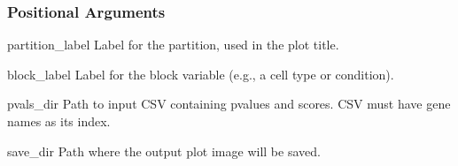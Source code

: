 \documentclass[letterpaper,10pt,english]{sphinxmanual}
\begin{document}
\begin{sphinxVerbatim}[commandchars=\\\{\}]
  \PYG{p}{[}\PYG{p}{]} \PYG{p}{[}  \PYG{p}{[} \PYG{p}{]}\PYG{p}{]} \PYG{p}{[} \PYG{p}{]} \PYG{p}{[} \PYG{p}{]}
                             \PYG{p}{[}  \PYG{p}{[} \PYG{p}{]}\PYG{p}{]}
                                
\end{sphinxVerbatim}


\subsubsection{Positional Arguments}
\label{\detokenize{cli:positional-arguments_repeat3}}\begin{optionlist}{3cm}
\item [partition\_label]  
\sphinxAtStartPar
Label for the partition, used in the plot title.
\item [block\_label]  
\sphinxAtStartPar
Label for the block variable (e.g., a cell type or condition).
\item [pvals\_dir]  
\sphinxAtStartPar
Path to input CSV containing p\sphinxhyphen{}values and scores. CSV must have gene names as its index.
\item [save\_dir]  
\sphinxAtStartPar
Path where the output plot image will be saved.
\end{optionlist}
\end{document}
